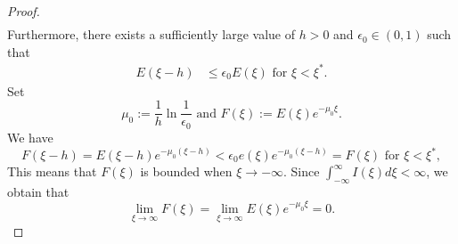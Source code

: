 \documentclass[final,3p,times]{elsarticle}
\numberwithin{equation}{section}
\begin{document}
\begin{proof}
\begin{align}
\label{eq:4.6}
\end{align}
Furthermore, there exists a sufficiently large value of \(h > 0\) and \(\epsilon_0\in(0, 1)\) such that
\begin{align}
E(\xi - h)&\leq\epsilon_0E(\xi) \text{ for } \xi < \xi^*.
\end{align}
Set
\[
\mu_0:=\frac{1}{h}\ln\frac{1}{\epsilon_0} \text{ and } F(\xi):=E(\xi)e^{-\mu_0\xi}.
\]
We have
\[
F(\xi - h)=E(\xi - h)e^{-\mu_0(\xi - h)}<\epsilon_0e(\xi)e^{-\mu_0(\xi - h)} = F(\xi) \text{ for } \xi < \xi^*,
\]
This means that \(F(\xi)\) is bounded when \(\xi\to-\infty\).
Since \(\int_{-\infty}^{\infty}I(\xi)d\xi < \infty\), we obtain that
\[
\lim_{\xi\to\infty}F(\xi)=\lim_{\xi\to\infty}E(\xi)e^{-\mu_0\xi}=0.
\]


\end{proof}
\end{document}
